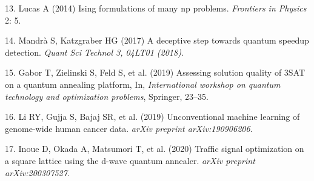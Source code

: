 \documentclass[
]{article}
\begin{document}
\leavevmode\hypertarget{ref-Lucas2014}{}%
13. Lucas A (2014) Ising formulations of many np problems.
\emph{Frontiers in Physics} 2: 5.

\leavevmode\hypertarget{ref-Mandra2017}{}%
14. Mandrà S, Katzgraber HG (2017) A deceptive step towards quantum
speedup detection. \emph{Quant Sci Technol 3, 04LT01 (2018)}.

\leavevmode\hypertarget{ref-Gabor2019}{}%
15. Gabor T, Zielinski S, Feld S, et al. (2019) Assessing solution
quality of 3SAT on a quantum annealing platform, In, \emph{International
workshop on quantum technology and optimization problems}, Springer,
23--35.

\leavevmode\hypertarget{ref-Li2019}{}%
16. Li RY, Gujja S, Bajaj SR, et al. (2019) Unconventional machine
learning of genome-wide human cancer data. \emph{arXiv preprint
arXiv:190906206}.

\leavevmode\hypertarget{ref-Inoue2020}{}%
17. Inoue D, Okada A, Matsumori T, et al. (2020) Traffic signal
optimization on a square lattice using the d-wave quantum annealer.
\emph{arXiv preprint arXiv:200307527}.
\end{document}
